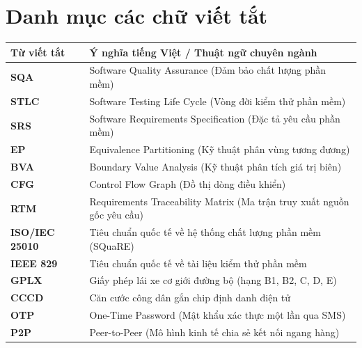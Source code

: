 \documentclass[12pt,a4paper,oneside]{report}
\begin{document}

\tableofcontents
\newpage

\listoffigures
{}
\newpage

\listoftables
{}
\newpage

\chapter*{Danh mục các chữ viết tắt}

\begin{table}[ht]
  \centering\small
  \begin{tabularx}{\textwidth}{lX}
    \toprule
    \textbf{Từ viết tắt} & \textbf{Ý nghĩa tiếng Việt / Thuật ngữ chuyên ngành} \\
    \midrule
    \textbf{SQA} & Software Quality Assurance (Đảm bảo chất lượng phần mềm) \\
    \textbf{STLC} & Software Testing Life Cycle (Vòng đời kiểm thử phần mềm) \\
    \textbf{SRS} & Software Requirements Specification (Đặc tả yêu cầu phần mềm) \\
    \textbf{EP} & Equivalence Partitioning (Kỹ thuật phân vùng tương đương) \\
    \textbf{BVA} & Boundary Value Analysis (Kỹ thuật phân tích giá trị biên) \\
    \textbf{CFG} & Control Flow Graph (Đồ thị dòng điều khiển) \\
    \textbf{RTM} & Requirements Traceability Matrix (Ma trận truy xuất nguồn gốc yêu cầu) \\
    \textbf{ISO/IEC 25010} & Tiêu chuẩn quốc tế về hệ thống chất lượng phần mềm (SQuaRE) \\
    \textbf{IEEE 829} & Tiêu chuẩn quốc tế về tài liệu kiểm thử phần mềm \\
    \textbf{GPLX} & Giấy phép lái xe cơ giới đường bộ (hạng B1, B2, C, D, E) \\
    \textbf{CCCD} & Căn cước công dân gắn chip định danh điện tử \\
    \textbf{OTP} & One-Time Password (Mật khẩu xác thực một lần qua SMS) \\
    \textbf{P2P} & Peer-to-Peer (Mô hình kinh tế chia sẻ kết nối ngang hàng) \\

\end{tabularx}
\end{table}
\end{document}
